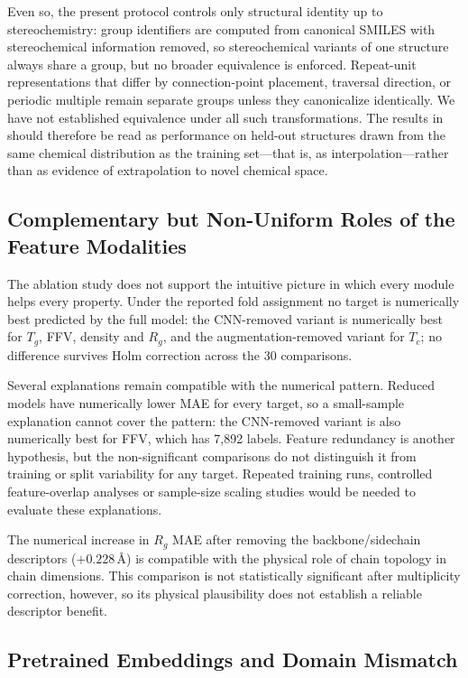 \documentclass{article}
\begin{document}
Even so, the present protocol controls only structural identity up to stereochemistry: group identifiers are computed from canonical SMILES with stereochemical information removed, so stereochemical variants of one structure always share a group, but no broader equivalence is enforced. Repeat-unit representations that differ by connection-point placement, traversal direction, or periodic multiple remain separate groups unless they canonicalize identically. We have not established equivalence under all such transformations. The results in  should therefore be read as performance on held-out structures drawn from the same chemical distribution as the training set---that is, as interpolation---rather than as evidence of extrapolation to novel chemical space.

\subsection{Complementary but Non-Uniform Roles of the Feature Modalities}

The ablation study does not support the intuitive picture in which every module helps every property. Under the reported fold assignment no target is numerically best predicted by the full model: the CNN-removed variant is numerically best for $T_g$, FFV, density and $R_g$, and the augmentation-removed variant for $T_c$; no difference survives Holm correction across the 30 comparisons.

Several explanations remain compatible with the numerical pattern. Reduced models have numerically lower MAE for every target, so a small-sample explanation cannot cover the pattern: the CNN-removed variant is also numerically best for FFV, which has 7{,}892 labels. Feature redundancy is another hypothesis, but the non-significant comparisons do not distinguish it from training or split variability for any target. Repeated training runs, controlled feature-overlap analyses or sample-size scaling studies would be needed to evaluate these explanations.

The numerical increase in $R_g$ MAE after removing the backbone/sidechain descriptors ($+0.228$\,\AA) is compatible with the physical role of chain topology in chain dimensions. This comparison is not statistically significant after multiplicity correction, however, so its physical plausibility does not establish a reliable descriptor benefit.

\subsection{Pretrained Embeddings and Domain Mismatch}
\end{document}
